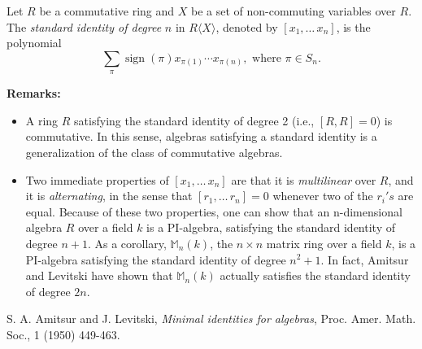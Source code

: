 \documentclass[12pt]{article}
\begin{document}
Let $R$ be a commutative ring and $X$ be a set of non-commuting variables over $R$.  The \emph{standard identity of degree} $n$ in $R\langle X \rangle$, denoted by $[x_1,\ldots\,x_n]$, is the polynomial $$\sum_{\pi} \operatorname{sign}(\pi)x_{\pi(1)}\cdots x_{\pi(n)},\mbox{ where }\pi \in S_n.$$

\textbf{Remarks:}
\begin{itemize}
\item
A ring $R$ satisfying the standard identity of degree 2 (i.e., $[R,R]=0$) is commutative.  In this sense, algebras satisfying a standard identity is a generalization of the class of commutative algebras.
\item
Two immediate properties of $[x_1,\ldots\,x_n]$ are that it is \emph{multilinear} over $R$, and it is \emph{alternating}, in the sense that $[r_1,\ldots\,r_n]=0$ whenever two of the $r_i's$ are equal.  Because of these two properties, one can show that an n-dimensional algebra $R$ over a field $k$ is a PI-algebra, satisfying the standard identity of degree $n+1$.  As a corollary, $\mathbb{M}_n(k)$, the $n\times n$ matrix ring over a field $k$, is a PI-algebra satisfying the standard identity of degree $n^2+1$.  In fact, Amitsur and Levitski have shown that $\mathbb{M}_n(k)$ actually satisfies the standard identity of degree $2n$.
\end{itemize}

\begin{thebibliography}{7}
 S. A. Amitsur and J. Levitski, {\em Minimal identities for algebras}, Proc. Amer. Math. Soc., 1 (1950) 449-463.
\end{thebibliography}
\end{document}
